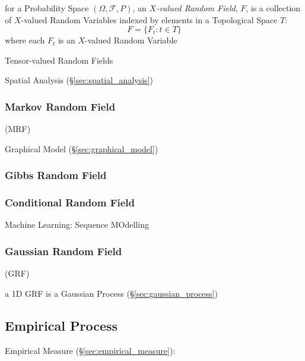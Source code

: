 for a Probability Space $(\Omega, \mathcal{F}, P)$, an \emph{$X$-valued
  Random Field}, $F$, is a collection of $X$-valued Random Variables indexed by
elements in a Topological Space $T$:
\[
  F = \{ F_t : t \in T \}
\]
where each $F_t$ is an $X$-valued Random Variable

Tensor-valued Random Fields

\fist Spatial Analysis (\S\ref{sec:spatial_analysis})



\subsubsection{Markov Random Field}\label{sec:markov_random_field}

(MRF)

Graphical Model (\S\ref{sec:graphical_model})



\subsubsection{Gibbs Random Field}\label{sec:gibbs_random_field}

\subsubsection{Conditional Random Field}\label{sec:conditional_random_field}

Machine Learning: Sequence MOdelling



\subsubsection{Gaussian Random Field}\label{sec:gaussian_random_field}

(GRF)

a 1D GRF is a Gaussian Process (\S\ref{sec:gaussian_process})



\subsection{Empirical Process}\label{sec:empirical_process}

Empirical Measure (\S\ref{sec:empirical_measure}):

